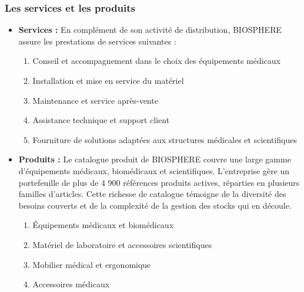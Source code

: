 \subsubsection{Les services et les produits}
\begin{itemize}
    \item \textbf{Services :} En complément de son activité de distribution, BIOSPHERE assure les prestations de services suivantes :
    \begin{enumerate}
        \item Conseil et accompagnement dans le choix des équipements médicaux
        \item Installation et mise en service du matériel
        \item Maintenance et service après-vente
        \item Assistance technique et support client
        \item Fourniture de solutions adaptées aux structures médicales et scientifiques
    \end{enumerate}
    \item \textbf{Produits :} Le catalogue produit de BIOSPHERE couvre une large gamme d'équipements médicaux, biomédicaux et scientifiques. 
L'entreprise gère un portefeuille de plus de 4 900 références produits actives, réparties en plusieurs familles d'articles. Cette richesse de catalogue témoigne de la diversité des besoins couverts et de la complexité de la gestion des stocks qui en découle.
    \begin{enumerate}
        \item Équipements médicaux et biomédicaux
        \item Matériel de laboratoire et accessoires scientifiques
        \item Mobilier médical et ergonomique 
        \item Accessoires médicaux
    \end{enumerate}
\end{itemize}

